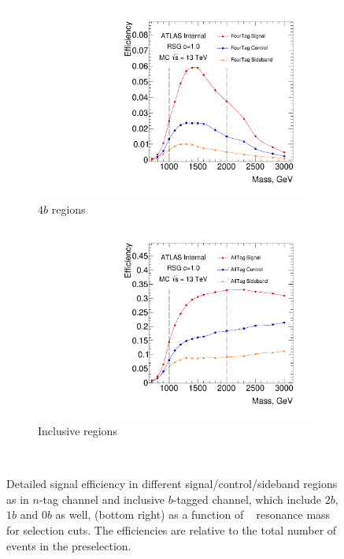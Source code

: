 \begin{figure}[htb!]
    \begin{subfigure}[b]{0.4\textwidth}
        \includegraphics[width=\textwidth,angle=-90]{figures/boosted/SigEff/region_4b_lst_Moriond_Efficiency_PreSel.pdf}
        \caption{$4b$ regions}
        \label{fig:4b-selection-region-efficiency}
    \end{subfigure}
    \quad \quad 
    \begin{subfigure}[b]{0.4\textwidth}
        \includegraphics[width=\textwidth,angle=-90]{figures/boosted/SigEff/region_alltag_lst_Moriond_Efficiency_PreSel.pdf}
        \caption{Inclusive regions}
        \label{fig:alltag-selection-region-efficiency}
    \end{subfigure} \\ 
   \caption{
   Detailed signal efficiency in different signal/control/sideband regions as in $n$-tag channel and inclusive $b$-tagged channel, which include $2b$, $1b$ and 0$b$ as well, (bottom right) as a function of \Grav~ resonance mass for selection cuts. The efficiencies are relative to the total number of events in the preselection.}
  \label{fig:boosted-selection-region-efficiency}
\end{figure}



